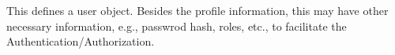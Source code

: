 This defines a user object. Besides the profile information, this may have
other necessary information, e.g., passwrod hash, roles, etc., to facilitate
the Authentication/Authorization.